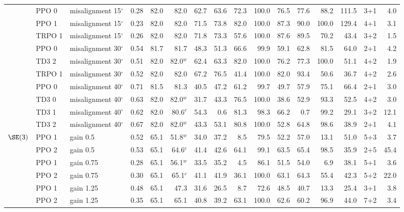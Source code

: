 \begin{tabular}{@{}lllrrrrrrrrrrrrr@{}}
 & PPO 0 & misalignment 15$^\circ$ & 0.28 & 82.0 & 82.0 & 62.7 & 63.6 & 72.3 & 100.0 & 76.5 & 77.6 & 88.2 & 111.5 & 3+1 & 4.0 \\
 & PPO 1 & misalignment 15$^\circ$ & 0.23 & 82.0 & 82.0 & 71.5 & 73.8 & 82.0 & 100.0 & 87.3 & 90.0 & 100.0 & 129.4 & 4+1 & 3.1 \\
 & TRPO 1 & misalignment 15$^\circ$ & 0.26 & 82.0 & 82.0 & 71.8 & 73.3 & 57.6 & 100.0 & 87.6 & 89.5 & 70.2 & 43.4 & 3+2 & 1.5 \\
 & PPO 0 & misalignment 30$^\circ$ & 0.54 & 81.7 & 81.7 & 48.3 & 51.3 & 66.6 & 99.9 & 59.1 & 62.8 & 81.5 & 64.0 & 2+1 & 4.2 \\
 & TD3 2 & misalignment 30$^\circ$ & 0.51 & 82.0 & 82.0$^{w}$ & 62.4 & 63.3 & 82.0 & 100.0 & 76.2 & 77.3 & 100.0 & 51.1 & 4+2 & 1.9 \\
 & TRPO 1 & misalignment 30$^\circ$ & 0.52 & 82.0 & 82.0 & 67.2 & 76.5 & 41.4 & 100.0 & 82.0 & 93.4 & 50.6 & 36.7 & 4+2 & 2.6 \\
 & PPO 0 & misalignment 40$^\circ$ & 0.71 & 81.5 & 81.3 & 40.5 & 47.2 & 61.2 & 99.7 & 49.7 & 57.9 & 75.1 & 66.4 & 2+1 & 3.0 \\
 & TD3 0 & misalignment 40$^\circ$ & 0.63 & 82.0 & 82.0$^{w}$ & 31.7 & 43.3 & 76.5 & 100.0 & 38.6 & 52.9 & 93.3 & 52.5 & 4+2 & 3.0 \\
 & TD3 1 & misalignment 40$^\circ$ & 0.62 & 82.0 & 80.6$^{c}$ & 54.3 & 0.6 & 81.3 & 98.3 & 66.2 & 0.7 & 99.2 & 29.1 & 3+2 & 12.1 \\
 & TD3 2 & misalignment 40$^\circ$ & 0.67 & 82.0 & 82.0$^{w}$ & 43.3 & 53.1 & 80.8 & 100.0 & 52.8 & 64.8 & 98.6 & 38.9 & 2+1 & 4.1 \\
\midrule
$\SE(3)$ & PPO 1 & gain 0.5 & 0.52 & 65.1 & 51.8$^{w}$ & 34.0 & 37.2 & 8.5 & 79.5 & 52.2 & 57.0 & 13.1 & 51.0 & 5+3 & 3.7 \\
 & PPO 2 & gain 0.5 & 0.53 & 65.1 & 64.6$^{c}$ & 41.4 & 42.6 & 64.1 & 99.1 & 63.5 & 65.4 & 98.5 & 35.9 & 2+5 & 45.4 \\
 & PPO 1 & gain 0.75 & 0.28 & 65.1 & 56.1$^{w}$ & 33.5 & 35.2 & 4.5 & 86.1 & 51.5 & 54.0 & 6.9 & 38.1 & 5+1 & 3.6 \\
 & PPO 2 & gain 0.75 & 0.30 & 65.1 & 65.1$^{c}$ & 41.1 & 41.9 & 36.1 & 100.0 & 63.1 & 64.3 & 55.4 & 42.3 & 5+2 & 22.0 \\
 & PPO 1 & gain 1.25 & 0.48 & 65.1 & 47.3 & 31.6 & 26.5 & 8.7 & 72.6 & 48.5 & 40.7 & 13.3 & 25.4 & 3+1 & 3.8 \\
 & PPO 2 & gain 1.25 & 0.35 & 65.1 & 65.1 & 40.8 & 39.2 & 63.1 & 100.0 & 62.6 & 60.2 & 96.9 & 44.0 & 7+2 & 3.4 \\

\end{tabular}
